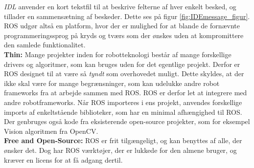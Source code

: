 \textit{IDL} anvender en kort tekstfil til at beskrive felterne af hver enkelt besked, og tillader en sammensætning af beskeder.
Dette ses på figur \ref{fig:IDEmessage_figur}.
ROS udgør altså en platform, hvor der er mulighed for at blande de fornævnte programmeringssprog på kryds og tværs som der ønskes uden at kompromittere den samlede funktionalitet.\\
\newline
\textbf{Thin:} Mange projekter inden for robotteknologi består af mange forskellige drivers og algoritmer, som kan bruges uden for det egentlige projekt.
Derfor er ROS designet til at være så \textit{tyndt} som overhovedet muligt.
Dette skyldes, at der ikke skal være for mange begrænsninger, som kan udelukke andre robot frameworks fra at arbejde sammen med ROS.
ROS er derfor let at integrere med andre robotframeworks.
Når ROS importeres i ens projekt, anvendes forskellige imports af enkeltstående biblioteker, som har en minimal afhængighed til ROS.
Der genbruges også kode fra eksisterende open-source projekter, som for eksempel Vision algoritmen fra OpenCV.\\
\newline
\textbf{Free and Open-Source:}
ROS er frit tilgængeligt, og kan benyttes af alle, der ønsker det.
Dog har ROS værktøjer, der er lukkede for den almene bruger, og kræver en licens for at få adgang dertil.

